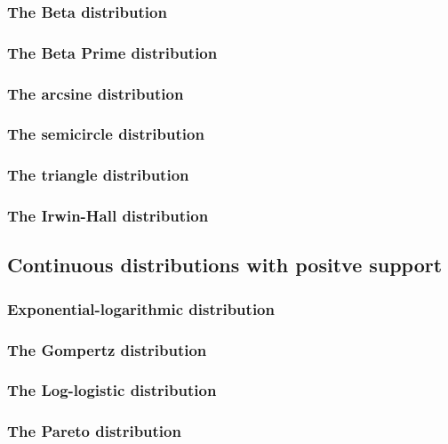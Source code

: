 \subsubsection{The Beta distribution}

\subsubsection{The Beta Prime distribution}

\subsubsection{The arcsine distribution}

\subsubsection{The semicircle distribution}

\subsubsection{The triangle distribution}

\subsubsection{The Irwin-Hall distribution}

\subsection{Continuous distributions with positve support}

\subsubsection{Exponential-logarithmic distribution}

\subsubsection{The Gompertz distribution}

\subsubsection{The Log-logistic distribution}

\subsubsection{The Pareto distribution}

